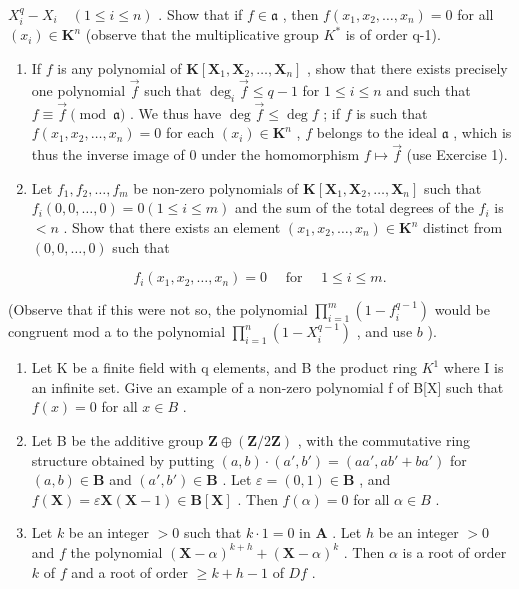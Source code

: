 \(X_{i}^{q}-X_{i}\quad(1\leqslant i\leqslant n)\) . Show that if \(f\in\mathfrak{a}\) , then \(f(x_{1},x_{2},\ldots,x_{n})=0\) for all \((x_{i})\in\mathbf{K}^{n}\) (observe that the multiplicative group \(K^{*}\) is of order q-1).

\begin{enumerate}
\def\labelenumi{\alph{enumi})}
\setcounter{enumi}{1}
\item
  If \(f\) is any polynomial of \(\mathbf{K}[\mathbf{X}_1, \mathbf{X}_2, \ldots, \mathbf{X}_n]\) , show that there exists precisely one polynomial \(\vec{f}\) such that \(\deg_i \vec{f} \leqslant q - 1\) for \(1 \leqslant i \leqslant n\) and such that \(f \equiv \vec{f} \pmod{\mathfrak{a}}\) . We thus have \(\deg \vec{f} \leqslant \deg f\) ; if \(f\) is such that \(f(x_1, x_2, \ldots, x_n) = 0\) for each \((x_i) \in \mathbf{K}^n\) , \(f\) belongs to the ideal \(\mathfrak{a}\) , which is thus the inverse image of 0 under the homomorphism \(f \mapsto \vec{f}\) (use Exercise 1).
\item
  Let \(f_1, f_2, \ldots, f_m\) be non-zero polynomials of \(\mathbf{K}[\mathbf{X}_1, \mathbf{X}_2, \ldots, \mathbf{X}_n]\) such that \(f_i(0, 0, \ldots, 0) = 0 (1 \leqslant i \leqslant m)\) and the sum of the total degrees of the \(f_i\) is \(< n\) . Show that there exists an element \((x_1, x_2, \ldots, x_n) \in \mathbf{K}^n\) distinct from \((0, 0, \ldots, 0)\) such that
\end{enumerate}

\[
f _ {i} (x _ {1}, x _ {2}, \dots , x _ {n}) = 0 \quad \text { for } \quad 1 \leqslant i \leqslant m.
\]

(Observe that if this were not so, the polynomial \(\prod_{i=1}^{m} (1 - f_i^{q-1})\) would be congruent mod a to the polynomial \(\prod_{i=1}^{n} (1 - X_i^{q-1})\) , and use \(b\) ).

\begin{enumerate}
\def\labelenumi{\arabic{enumi})}
\setcounter{enumi}{6}
\item
  Let K be a finite field with q elements, and B the product ring \(K^{1}\) where I is an infinite set. Give an example of a non-zero polynomial f of B{[}X{]} such that \(f(x)=0\) for all \(x\in B\) .
\item
  Let B be the additive group \(\mathbf{Z} \oplus (\mathbf{Z}/2\mathbf{Z})\) , with the commutative ring structure obtained by putting \((a, b) \cdot (a', b') = (aa', ab' + ba')\) for \((a, b) \in \mathbf{B}\) and \((a', b') \in \mathbf{B}\) . Let \(\varepsilon = (0, 1) \in \mathbf{B}\) , and \(f(\mathbf{X}) = \varepsilon \mathbf{X}(\mathbf{X} - 1) \in \mathbf{B}[\mathbf{X}]\) . Then \(f(\alpha) = 0\) for all \(\alpha \in B\) .
\item
  Let \(k\) be an integer \(> 0\) such that \(k \cdot 1 = 0\) in \(\mathbf{A}\) . Let \(h\) be an integer \(> 0\) and \(f\) the polynomial \((\mathbf{X} - \alpha)^{k + h} + (\mathbf{X} - \alpha)^k\) . Then \(\alpha\) is a root of order \(k\) of \(f\) and a root of order \(\geqslant k + h - 1\) of \(Df\) .
\end{enumerate}

